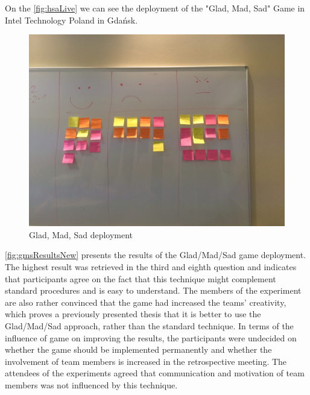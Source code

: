On the \autoref{fig:hsaLive} we can see the deployment of the "Glad, Mad, Sad" Game in Intel Technology Poland in Gdańsk.

\begin{figure}[!htbp]
\caption{Glad, Mad, Sad deployment}
\label{fig:hsaLive}
\centering
\includegraphics[width=1\textwidth]{live/hsaLive}
\end{figure}

\autoref{fig:gmsResultsNew} presents the results of the Glad/Mad/Sad game deployment. The highest result was retrieved in the third and eighth question and indicates that participants agree on the fact that this technique might complement standard procedures and is easy to understand. The members of the experiment are also rather convinced that the game had increased the teams' creativity, which proves a previously presented thesis that it is better to use the Glad/Mad/Sad approach, rather than the standard technique. In terms of the influence of game on improving the results, the participants were undecided on whether the game should be implemented permanently and whether the involvement of team members is increased in the retrospective meeting. The attendees of the experiments agreed that communication and motivation of team members was not influenced by this technique.    

